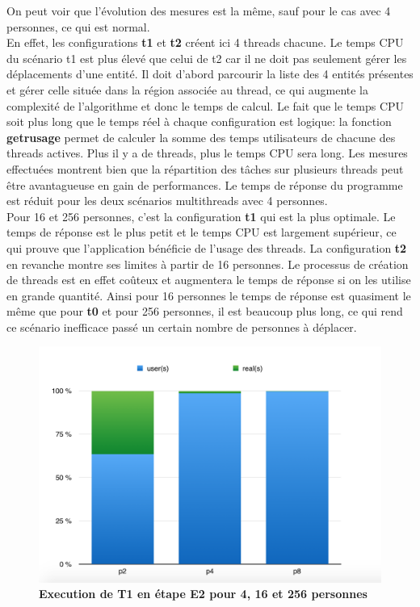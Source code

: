 \documentclass[11pt]{article} %
\begin{document}
On peut voir que l'évolution des mesures est la même, sauf pour le cas avec 4 personnes, ce qui est normal. \\
En effet, les configurations \textbf{t1} et \textbf{t2} créent ici 4 threads chacune. Le temps CPU du scénario t1 est plus élevé que celui de t2 car il ne doit pas seulement gérer les déplacements d'une entité. Il doit d'abord parcourir la liste des 4 entités présentes et gérer celle située dans la région associée au thread, ce qui augmente la complexité de l'algorithme et donc le temps de calcul. 
Le fait que le temps CPU soit plus long que le temps réel à chaque configuration est logique: la fonction \textbf{getrusage} permet de calculer la somme des temps utilisateurs de chacune des threads actives. Plus il y a de threads, plus le temps CPU sera long. Les mesures effectuées montrent bien que la répartition des tâches sur plusieurs threads peut être avantagueuse en gain de performances. Le temps de réponse du programme est réduit pour les deux scénarios multithreads avec 4 personnes. \\
Pour 16 et 256 personnes, c'est la configuration \textbf{t1} qui est la plus optimale. Le temps de réponse est le plus petit et le temps CPU est largement supérieur, ce qui prouve que l'application bénéficie de l'usage des threads. La configuration \textbf{t2} en revanche montre ses limites à partir de 16 personnes. Le processus de création de threads est en effet coûteux et augmentera le temps de réponse si on les utilise en grande quantité. Ainsi pour 16 personnes le temps de réponse est quasiment le même que pour \textbf{t0} et pour 256 personnes, il est beaucoup plus long, ce qui rend ce scénario inefficace passé un certain nombre de personnes à déplacer.

\begin{figure}[h]
\caption{\label{f2} \textbf{Execution de T1 en étape E2 pour 4, 16 et 256 personnes}}
  \centering
\includegraphics[width=12cm]{figure7}
\end{figure}
\end{document}
